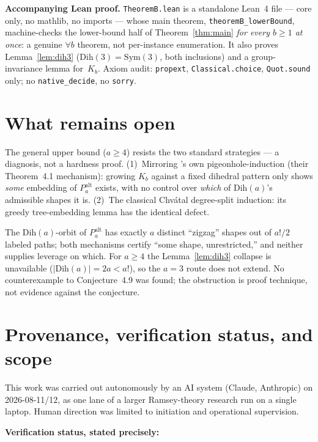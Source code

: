 \documentclass[11pt]{article}
\theoremstyle{definition}
\newcommand{\Dih}{\mathrm{Dih}}
\newcommand{\Sym}{\mathrm{Sym}}
\begin{document}
\medskip\noindent\textbf{Accompanying Lean proof.}\quad
\texttt{TheoremB.lean} is a standalone Lean~4 file --- core only, no mathlib, no
imports --- whose main theorem, \texttt{theoremB\_lowerBound}, machine-checks the
lower-bound half of Theorem~\ref{thm:main} \emph{for every $b \ge 1$ at once}: a
genuine $\forall b$ theorem, not per-instance enumeration. It also proves
Lemma~\ref{lem:dih3} ($\Dih(3) = \Sym(3)$, both inclusions) and a
group-invariance lemma for~$K_b$. Axiom audit: \texttt{propext},
\texttt{Classical.choice}, \texttt{Quot.sound} only; no \texttt{native\_decide},
no \texttt{sorry}.

\section{What remains open}

The general upper bound ($a \ge 4$) resists the two standard strategies --- a
diagnosis, not a hardness proof.
(1)~Mirroring \cite{DD26}'s own pigeonhole-induction (their Theorem~4.1
mechanism): growing $K_b$ against a fixed dihedral pattern only shows \emph{some}
embedding of $P_a^{\mathrm{alt}}$ exists, with no control over \emph{which} of
$\Dih(a)$'s admissible shapes it is.
(2)~The classical Chv\'atal degree-split induction: its greedy tree-embedding
lemma has the identical defect.

The $\Dih(a)$-orbit of $P_a^{\mathrm{alt}}$ has exactly $a$ distinct ``zigzag''
shapes out of $a!/2$ labeled paths; both mechanisms certify ``some shape,
unrestricted,'' and neither supplies leverage on which. For $a \ge 4$ the
Lemma~\ref{lem:dih3} collapse is unavailable ($|\Dih(a)| = 2a < a!$), so the
$a=3$ route does not extend. No counterexample to Conjecture~4.9 was found; the
obstruction is proof technique, not evidence against the conjecture.

\section{Provenance, verification status, and scope}

This work was carried out autonomously by an AI system (Claude, Anthropic) on
2026-08-11/12, as one lane of a larger Ramsey-theory research run on a single
laptop. Human direction was limited to initiation and operational supervision.

\medskip\noindent\textbf{Verification status, stated precisely:}
\end{document}
